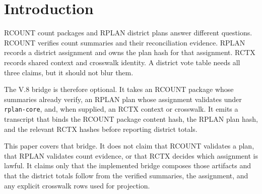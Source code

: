 \section{Introduction}

RCOUNT count packages and RPLAN district plans answer different questions.
RCOUNT verifies count summaries and their reconciliation evidence. RPLAN records
a district assignment and owns the plan hash for that assignment. RCTX records
shared context and crosswalk identity. A district vote table needs all three
claims, but it should not blur them.

The V.8 bridge is therefore optional. It takes an RCOUNT package whose summaries
already verify, an RPLAN plan whose assignment validates under \texttt{rplan-core},
and, when supplied, an RCTX context or crosswalk. It emits a transcript that
binds the RCOUNT package content hash, the RPLAN plan hash, and the relevant
RCTX hashes before reporting district totals.

This paper covers that bridge. It does not claim that RCOUNT validates a plan,
that RPLAN validates count evidence, or that RCTX decides which assignment is
lawful. It claims only that the implemented bridge composes those artifacts and
that the district totals follow from the verified summaries, the assignment, and
any explicit crosswalk rows used for projection.
